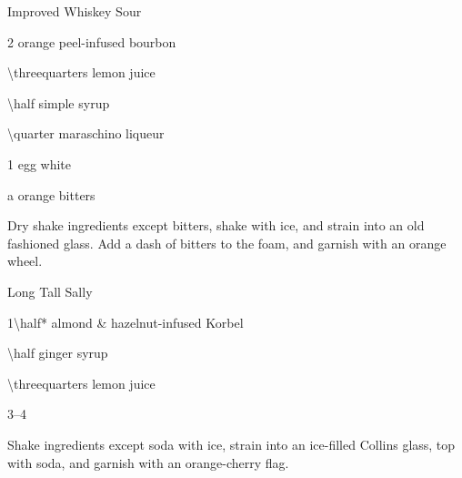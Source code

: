 \begin{Cocktail*}{Improved Whiskey Sour}  %
	\begin{Ingredients}
	\item \SI{2}{\oz} orange peel-infused bourbon
	\item \SI{\threequarters}{\oz} lemon juice
	\item \SI{\half}{\oz} simple syrup
	\item \SI{\quarter}{\oz} maraschino liqueur %
	\item 1 egg white
	\item a \si{\dash} orange bitters
	\end{Ingredients}
	
	\begin{Instructions}
	Dry shake ingredients except bitters, shake with ice, and strain into an old fashioned glass.  Add a dash of bitters to the foam, and garnish with an orange wheel.
	\end{Instructions}
\end{Cocktail*}

\begin{Cocktail*}{Long Tall Sally} %
	\begin{Ingredients}
	\item \SI{1\half*}{\oz} almond \& hazelnut-infused Korbel \vsop
	\item \SI{\half}{\oz} ginger syrup
	\item \SI{\threequarters}{\oz} lemon juice
	\item \SIrange{3}{4}{\oz} \soda
	\end{Ingredients}
	
	\begin{Instructions}
	Shake ingredients except soda with ice, strain into an ice-filled Collins glass, top with soda, and garnish with an orange-cherry flag.
	\end{Instructions}
\end{Cocktail*}

